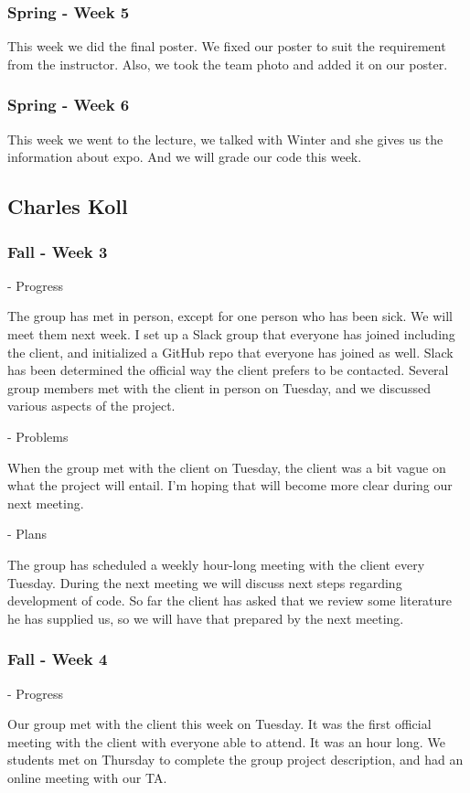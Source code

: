 \documentclass[onecolumn, draftclsnofoot,10pt, compsoc]{IEEEtran}
\begin{document}
\subsubsection{Spring - Week 5}
This week we did the final poster.
We fixed our poster to suit the requirement from the instructor.
Also, we took the team photo and added it on our poster.
\subsubsection{Spring - Week 6}
This week we went to the lecture, we talked with Winter and she gives us the information about expo.
And we will grade our code this week.
\subsection{Charles Koll}
\subsubsection{Fall - Week 3}
- Progress

The group has met in person, except for one person who has been sick.
We will meet them next week.
I set up a Slack group that everyone has joined including the client, and initialized a GitHub repo that everyone has joined as well.
Slack has been determined the official way the client prefers to be contacted.
Several group members met with the client in person on Tuesday, and we discussed various aspects of the project.

- Problems

When the group met with the client on Tuesday, the client was a bit vague on what the project will entail.
I'm hoping that will become more clear during our next meeting.

- Plans

The group has scheduled a weekly hour-long meeting with the client every Tuesday.
During the next meeting we will discuss next steps regarding development of code.
So far the client has asked that we review some literature he has supplied us, so we will have that prepared by the next meeting.
\subsubsection{Fall - Week 4}
- Progress

Our group met with the client this week on Tuesday.
It was the first official meeting with the client with everyone able to attend.
It was an hour long.
We students met on Thursday to complete the group project description, and had an online meeting with our TA.
\end{document}

